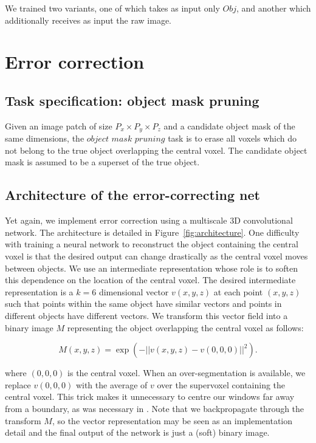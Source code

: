 \documentclass{article}
\begin{document}
We trained two variants, one of which takes as input only $Obj$, and another which additionally receives as input the raw image.

\section{Error correction}
\subsection{Task specification: object mask pruning}
Given an image patch of size $P_x\times P_y\times P_z$ and a candidate object mask of the same dimensions, the $\textit{object mask pruning}$ task is to erase all voxels which do not belong to the true object overlapping the central voxel.  The candidate object mask is assumed to be a superset of the true object.

\subsection{Architecture of the error-correcting net}
Yet again, we implement error correction using a multiscale 3D convolutional network. The architecture is detailed in Figure~\ref{fig:architecture}. One difficulty with training a neural network to reconstruct the object containing the central voxel is that the desired output can change drastically as the central voxel moves between objects. We use an intermediate representation whose role is to soften this dependence on the location of the central voxel. The desired intermediate representation is a $k=6$ dimensional vector $v(x,y,z)$ at each point $(x,y,z)$ such that points within the same object have similar vectors and points in different objects have different vectors. We transform this vector field into a binary image $M$ representing the object overlapping the central voxel as follows:

\begin{equation*}
	M(x,y,z)=\exp\left( -||v(x,y,z)-v(0,0,0)||^2 \right).
\end{equation*}

where $(0,0,0)$ is the central voxel. When an over-segmentation is available, we replace $v(0,0,0)$ with the average of $v$ over the supervoxel containing the central voxel. This trick makes it unnecessary to centre our windows far away from a boundary, as was necessary in \cite{floodfilling}. Note that we backpropagate through the transform $M$, so the vector representation may be seen as an implementation detail and the final output of the network is just a (soft) binary image.
\end{document}
